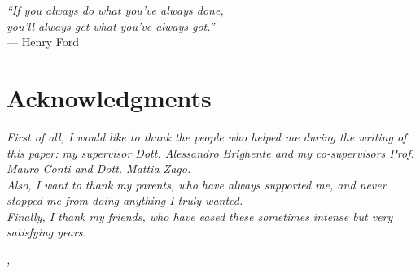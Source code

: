 
\cleardoublepage
{}
{}

\begin{flushright}{
	\slshape    
	``If you always do what you’ve always done, \\
	you’ll always get what you’ve always got.''} \\ 
	\medskip
    --- Henry Ford
\end{flushright}


\bigskip

\begingroup
\let\clearpage\relax
\let\cleardoublepage\relax
\let\cleardoublepage\relax

\chapter*{Acknowledgments}

\noindent \textit{First of all, I would like to thank the people who helped 
me during the writing of this paper: my supervisor Dott. Alessandro Brighente 
and my co-supervisors Prof. Mauro Conti and Dott. Mattia Zago.}\\

\noindent \textit{Also, I want to thank my parents, who have always supported
 me, and never stopped me from doing anything I truly wanted.}\\

\noindent \textit{Finally, I thank my friends, who have eased these sometimes 
intense but very satisfying years.}\\
\bigskip

\noindent\textit{\myLocation, \myTime}
\hfill \myName

\endgroup

